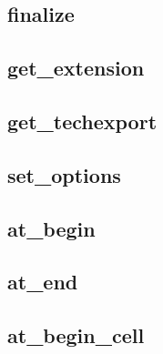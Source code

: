 \subsection{finalize}
%
\subsection{get\_extension}
%
\subsection{get\_techexport}
%
\subsection{set\_options}
%
\subsection{at\_begin}
%
\subsection{at\_end}
%
\subsection{at\_begin\_cell}
%
